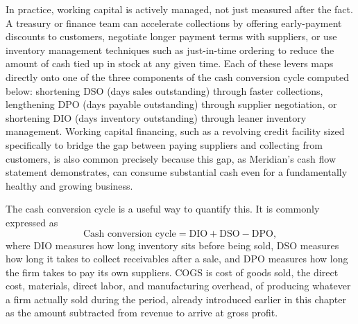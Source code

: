 \documentclass[../ai_in_finance]{subfiles}
\begin{document}
In practice, working capital is actively managed, not just measured after the fact. A treasury or finance team can accelerate collections by offering early-payment discounts to customers, negotiate longer payment terms with suppliers, or use inventory management techniques such as just-in-time ordering to reduce the amount of cash tied up in stock at any given time. Each of these levers maps directly onto one of the three components of the cash conversion cycle computed below:
shortening DSO (days sales outstanding) through faster collections, lengthening DPO (days payable outstanding) through supplier negotiation, or shortening DIO (days inventory outstanding) through leaner
 inventory management. Working capital financing, such as a revolving credit facility sized specifically to bridge
the gap between paying suppliers and collecting from customers, is also common precisely because this gap, as Meridian's
cash flow statement demonstrates, can consume substantial cash even for a fundamentally healthy and growing business.

The cash conversion cycle is a useful way to quantify this. It is commonly expressed as
\begin{equation*}
\text{Cash conversion cycle} = \text{DIO} + \text{DSO} - \text{DPO},
\end{equation*}
where DIO  measures how long inventory sits before being sold, DSO  measures how long it takes to collect receivables after a sale,
and DPO  measures how long the firm takes to pay its own suppliers. COGS is cost of goods sold, the direct cost, materials, direct labor, and manufacturing overhead, of producing whatever a firm actually sold during the period, already introduced earlier in this chapter as the amount subtracted from revenue to arrive at gross profit.
\end{document}
